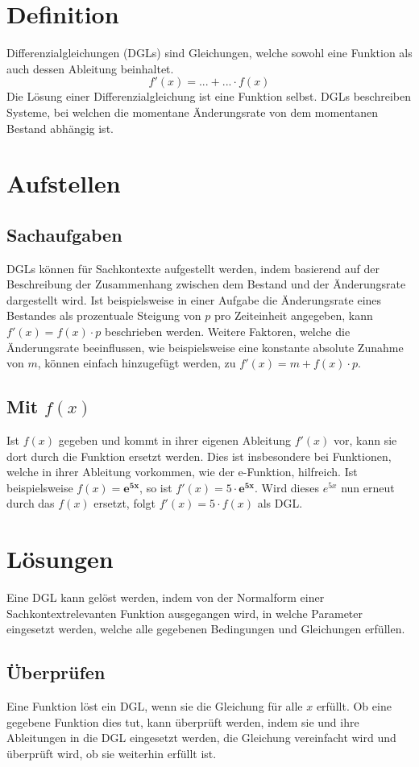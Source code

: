 \documentclass{article}
\begin{document}
\section{Definition} 
Differenzialgleichungen (DGLs) sind Gleichungen, welche sowohl eine Funktion als auch dessen Ableitung beinhaltet.
\[
 f'(x) = ... + ... \cdot f(x)
\]
Die Lösung einer Differenzialgleichung ist eine Funktion selbst. DGLs beschreiben Systeme, bei welchen die momentane Änderungsrate von dem momentanen Bestand abhängig ist.
 
\section{Aufstellen}
\subsection{Sachaufgaben} 
DGLs können für Sachkontexte aufgestellt werden, indem basierend auf der Beschreibung der Zusammenhang zwischen dem Bestand und der Änderungsrate dargestellt wird. \newline
Ist beispielsweise in einer Aufgabe die Änderungsrate eines Bestandes als prozentuale Steigung von $p$ pro Zeiteinheit angegeben, kann $f'(x) = f(x) \cdot p$ beschrieben werden. Weitere Faktoren, welche die Änderungsrate beeinflussen, wie beispielsweise eine konstante absolute Zunahme von $m$, können einfach hinzugefügt werden, zu $f'(x)=m + f(x) \cdot p$.
 
\subsection{Mit $f(x)$} 
Ist $f(x)$ gegeben und kommt in ihrer eigenen Ableitung $f'(x)$ vor, kann sie dort durch die Funktion ersetzt werden. Dies ist insbesondere bei Funktionen, welche in ihrer Ableitung vorkommen, wie der e-Funktion, hilfreich. \newline
Ist beispielsweise $f(x)=\mathbf{e^{5x}}$, so ist $f'(x)=5 \cdot \mathbf{e^{5x}}$. Wird dieses $e^{5x}$ nun erneut durch das $f(x)$ ersetzt, folgt $f'(x)=5 \cdot f(x)$ als DGL.
 
\section{Lösungen}
Eine DGL kann gelöst werden, indem von der Normalform einer Sachkontextrelevanten Funktion ausgegangen wird, in welche Parameter eingesetzt werden, welche alle gegebenen Bedingungen und Gleichungen erfüllen. 
\subsection{Überprüfen} 
Eine Funktion löst ein DGL, wenn sie die Gleichung für alle $x$ erfüllt. 
Ob eine gegebene Funktion dies tut, kann überprüft werden, indem sie und ihre Ableitungen in die DGL eingesetzt werden, die Gleichung vereinfacht wird und überprüft wird, ob sie weiterhin erfüllt ist.
\end{document}
